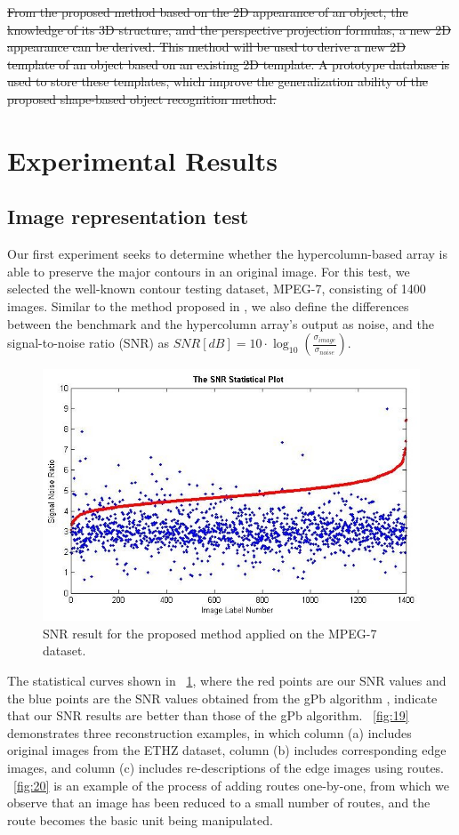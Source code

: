 \documentclass[journal]{IEEEtran}
\providecommand{\DIFdel}[1]{{\protect\color{red}\sout{#1}}}                      %
\providecommand{\DIFdelend}{} %
\begin{document}
\DIFdel{From the proposed method based on the 2D appearance of an object, 
the knowledge of its 3D structure, and the perspective projection formulas, 
a new 2D appearance can be derived. 
This method will be used to derive a new 2D template of an object based on an existing 2D template. 
A prototype database is used to store these templates, 
which improve the generalization ability of the proposed shape-based object recognition method.
}%

\DIFdelend \section{Experimental Results}

\subsection{Image representation test}

Our first experiment seeks to determine whether the hypercolumn-based array is able to preserve the major contours in an original image. 
For this test, we selected the well-known contour testing dataset, MPEG-7, consisting of 1400 images. 
Similar to the method proposed in \cite{russ1995}, 
we also define the differences between the benchmark and the hypercolumn array's output as noise, 
and the signal-to-noise ratio (SNR) as $SNR[dB]=10\cdot\log_10(\frac{\sigma_{image}}{\sigma_{noise}})$.

\begin{figure}[!t]
\centering
\includegraphics[width=0.7\linewidth]{images/fig18.jpg}
\caption{SNR result for the proposed method applied on the MPEG-7 dataset.}
\label{fig:18}
\end{figure}

The statistical curves shown in \figurename~\ref{fig:18}, 
where the red points are our SNR values and the blue points are the SNR values obtained from the gPb algorithm 
\cite{maire2008}, indicate that our SNR results are better than those of the gPb algorithm.
\figurename~\ref{fig:19} demonstrates three reconstruction examples,
in which column (a) includes original images from the ETHZ dataset, 
column (b) includes corresponding edge images, 
and column (c) includes re-descriptions of the edge images using routes.
\figurename~\ref{fig:20} is an example of the process of adding routes one-by-one, 
from which we observe that an image has been reduced to a small number of routes, and the route becomes the basic unit being manipulated.
\end{document}
